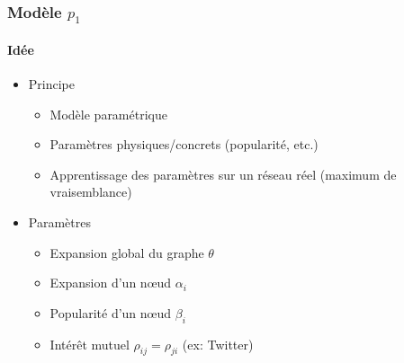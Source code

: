 \documentclass[c]{beamer}
\begin{document}
\begin{frame}
    \frametitle{Modèle $p_1$}
    \framesubtitle{Idée}

    \begin{itemize}
        \item<1-> Principe
            \begin{itemize}
                \item Modèle paramétrique
                \item Paramètres physiques/concrets (popularité, etc.)
                \item Apprentissage des paramètres sur un réseau réel (maximum
                    de vraisemblance)
            \end{itemize}
        \item<2-> Paramètres
            \begin{itemize}
                \item Expansion global du graphe $\theta$
                \item Expansion d'un n\oe{}ud $\alpha_i$
                \item Popularité d'un n\oe{}ud $\beta_i$
                \item Intérêt mutuel $\rho_{ij} = \rho_{ji}$ (ex: Twitter)
            \end{itemize}
    \end{itemize}
\end{frame}
\end{document}
